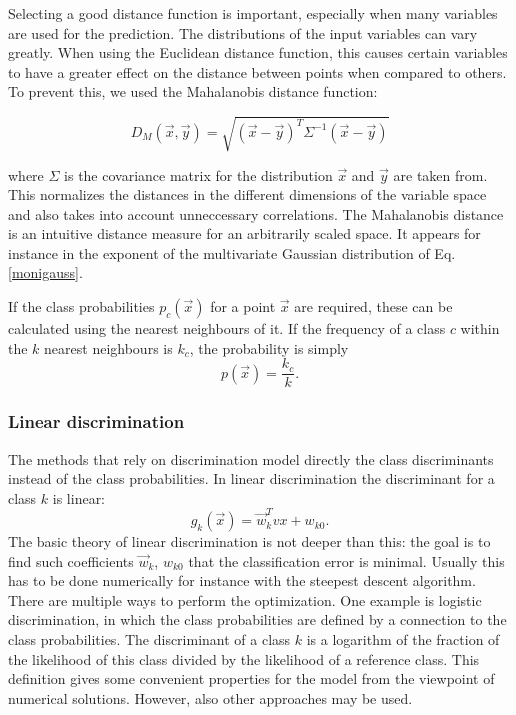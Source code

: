 \documentclass[twoside]{article}
\renewcommand{\v}[1]{\vec{#1}}
\begin{document}
\begin{multicols}{2}
Selecting a good distance function is important, especially when many variables
are used for the prediction. The distributions of the
input variables can vary greatly. When using the Euclidean distance function,
this causes certain variables to have a greater effect on the distance between
points when compared to others. To prevent this, we used the Mahalanobis
distance function\cite[p.~88]{Alpaydin}:

\begin{equation}\label{eq:mahalanobis}
  D_M(\v{x}, \v{y}) = \sqrt{(\v{x}-\v{y})^T \Sigma^{-1} (\v{x}-\v{y})}
\end{equation}

where $\Sigma$ is the covariance matrix for the 
distribution $\v{x}$ and $\v{y}$ are taken from.
This normalizes the distances in the different dimensions of
the variable space and also takes into account unneccessary correlations.
The Mahalanobis distance is an intuitive distance measure for an arbitrarily
scaled space. It appears for instance in the exponent of the multivariate
Gaussian distribution of Eq. \eqref{monigauss}.

If the class probabilities $p_c(\v{x})$ for a point $\v{x}$ are required, these can
be calculated using the nearest neighbours of it. If the frequency of a class $c$
within the $k$ nearest neighbours is $k_c$, the probability is simply
\begin{equation}
 p(\v{x}) = \frac{k_c}{k}.
\end{equation}

\subsubsection{Linear discrimination}

The methods that rely on discrimination model directly the class discriminants instead of
the class probabilities. In linear discrimination the discriminant for a class $k$ is linear:
\begin{equation}
 g_k(\v{x}) = \v{w}_k^T v{x} + w_{k0}.
\end{equation}
The basic theory of linear discrimination is not deeper than this: the goal is to find such
coefficients $\v{w}_k$, $w_{k0}$ that the classification error is minimal. Usually this has
to be done numerically for instance with the steepest descent algorithm. There are multiple 
ways to perform the optimization. One example
is logistic discrimination, in which the class probabilities are defined by a connection to the class
probabilities. The discriminant of a class $k$ is a logarithm of the fraction of the likelihood of
this class divided by the likelihood of a reference class. This definition gives some convenient 
properties for the model from the viewpoint of numerical solutions. However, also other
approaches may be used.


\end{multicols}
\end{document}
